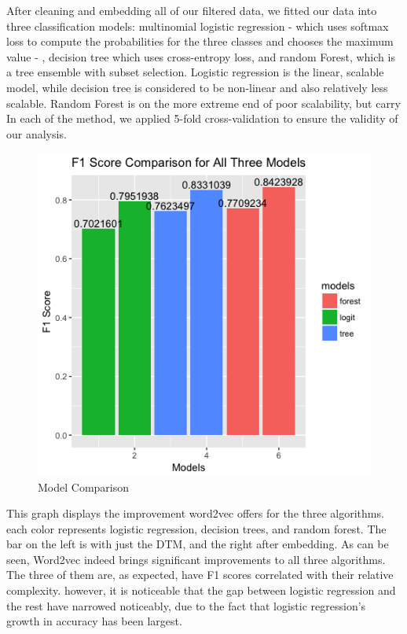 \documentclass[letterpaper, 12 pt, conference]{ieeeconf}  %
\begin{document}
After cleaning and embedding all of our filtered data, we fitted our data into three classification models: multinomial logistic regression - which uses softmax loss to compute the probabilities for the three classes and chooses the maximum value - , decision tree which uses cross-entropy loss, and random Forest, which is a tree ensemble with subset selection. Logistic regression is the linear, scalable model, while decision tree is considered to be non-linear and also relatively less scalable. Random Forest is on the more extreme end of poor scalability, but carry  In each of the method, we applied 5-fold cross-validation to ensure the validity of our analysis. 
\begin{figure}[h]
	\centering
	\includegraphics[scale=0.5]{model_comparison.png}
	\caption{Model Comparison}
    \label{model_comparison}
\end{figure}

This graph displays the improvement word2vec offers for the three algorithms. each color represents logistic regression, decision trees, and random forest. The bar on the left is with just the DTM, and the right after embedding. As can be seen, Word2vec indeed brings significant improvements to all three algorithms. The three of them are, as expected, have F1 scores correlated with their relative complexity. however, it is noticeable that the gap between logistic regression and the rest have narrowed noticeably, due to the fact that logistic regression's growth in accuracy has been largest.
\end{document}
